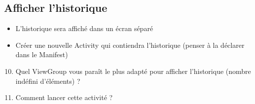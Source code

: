 \documentclass{article}
\begin{document}
\subsection{Afficher l'historique}
\begin{itemize}
\item L'historique sera affiché dans un écran séparé
\item Créer une nouvelle Activity qui contiendra l'historique (penser à la déclarer dans le Manifest)
\end{itemize}
\begin{enumerate}
 \setcounter{enumi}{9}
\item Quel ViewGroup vous paraît le plus adapté pour afficher l'historique (nombre indéfini d'éléments) ?
\item Comment lancer cette activité ?
\end{enumerate}
\end{document}
